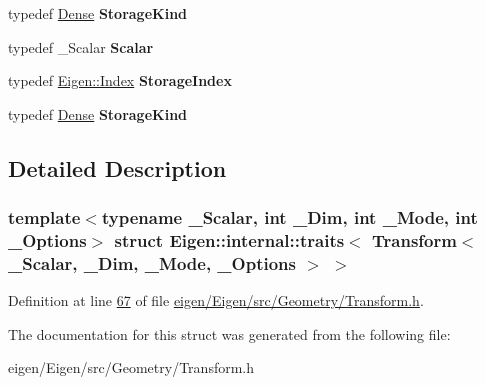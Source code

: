 \begin{DoxyCompactItemize}
\item 
\mbox{\label{struct_eigen_1_1internal_1_1traits_3_01_transform_3_01___scalar_00_01___dim_00_01___mode_00_01___options_01_4_01_4_a51db0187bef42885b7427a6de872565c}} 
typedef \hyperlink{struct_eigen_1_1_dense}{Dense} {\bfseries Storage\+Kind}
\item 
\mbox{\label{struct_eigen_1_1internal_1_1traits_3_01_transform_3_01___scalar_00_01___dim_00_01___mode_00_01___options_01_4_01_4_a752d8ba2ed25861d5053c89b7a61e754}} 
typedef \+\_\+\+Scalar {\bfseries Scalar}
\item 
\mbox{\label{struct_eigen_1_1internal_1_1traits_3_01_transform_3_01___scalar_00_01___dim_00_01___mode_00_01___options_01_4_01_4_a8aff88c71a2ca27edf22fa931c3740aa}} 
typedef \hyperlink{namespace_eigen_a62e77e0933482dafde8fe197d9a2cfde}{Eigen\+::\+Index} {\bfseries Storage\+Index}
\item 
\mbox{\label{struct_eigen_1_1internal_1_1traits_3_01_transform_3_01___scalar_00_01___dim_00_01___mode_00_01___options_01_4_01_4_a51db0187bef42885b7427a6de872565c}} 
typedef \hyperlink{struct_eigen_1_1_dense}{Dense} {\bfseries Storage\+Kind}
\end{DoxyCompactItemize}


\subsection{Detailed Description}
\subsubsection*{template$<$typename \+\_\+\+Scalar, int \+\_\+\+Dim, int \+\_\+\+Mode, int \+\_\+\+Options$>$\newline
struct Eigen\+::internal\+::traits$<$ Transform$<$ \+\_\+\+Scalar, \+\_\+\+Dim, \+\_\+\+Mode, \+\_\+\+Options $>$ $>$}



Definition at line \hyperlink{eigen_2_eigen_2src_2_geometry_2_transform_8h_source_l00067}{67} of file \hyperlink{eigen_2_eigen_2src_2_geometry_2_transform_8h_source}{eigen/\+Eigen/src/\+Geometry/\+Transform.\+h}.



The documentation for this struct was generated from the following file\+:\begin{DoxyCompactItemize}
\item 
eigen/\+Eigen/src/\+Geometry/\+Transform.\+h\end{DoxyCompactItemize}
